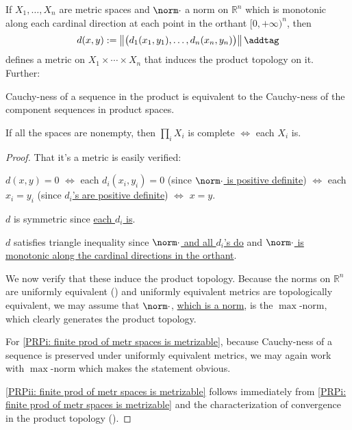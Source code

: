 	\begin{prp}\label{PRP: finite prod of metr spaces is metrizable}
		If $X_1, \ldots, X_n$ are metric spaces and $\norm\cdot$ a norm on $\mathbb R^n$ which is monotonic along each cardinal direction at each point in the orthant $[0, +\infty)^n$, then
		\[
		d(x, y) := \left\Vert \bigl(d_1(x_1, y_1), \ldots, d_n(x_n, y_n)\bigr) \right\Vert\addtag\label{EQN: metric on finite product}
		\]
		defines a metric on $X_1\times\cdots\times X_n$ that induces the product topology on it. Further:
		\begin{mylist}
			\item\label{PRPi: finite prod of metr spaces is metrizable} Cauchy-ness of a sequence in the product is equivalent to the Cauchy-ness of the component sequences in product spaces.
			
			\item\label{PRPii: finite prod of metr spaces is metrizable} If all the spaces are nonempty, then $\prod_i X_i$ is complete $\iff$ each $X_i$ is.
		\end{mylist}
	\end{prp}
	
	\begin{proof}
		That it's a metric is easily verified:
		\begin{prooflist}
			\item $d(x, y) = 0$ $\iff$ each $d_i(x_i, y_i) = 0$ (since \uline{$\norm\cdot$ is positive definite}) $\iff$ each $x_i = y_i$ (since \uline{$d_i$'s are positive definite}) $\iff$ $x = y$.
			
			\item $d$ is symmetric since \uline{each $d_i$ is}.
			
			\item $d$ satisfies triangle inequality since \uline{$\norm\cdot$ and all $d_i$'s do} and \uline{$\norm\cdot$ is monotonic along the cardinal directions in the orthant}.
		\end{prooflist}
		
		We now verify that these induce the product topology. Because the norms on $\mathbb R^n$ are uniformly equivalent () and uniformly equivalent metrics are topologically equivalent, we may assume \wlogg that $\norm\cdot$, \uline{which is a norm}, is the $\max$-norm, which clearly generates the product topology.
		
		For \ref{PRPi: finite prod of metr spaces is metrizable}, because Cauchy-ness of a sequence is preserved under uniformly equivalent metrics, we may again work with $\max$-norm which makes the statement obvious.
		
		\ref{PRPii: finite prod of metr spaces is metrizable} follows immediately from \ref{PRPi: finite prod of metr spaces is metrizable} and the characterization of convergence in the product topology ().
	\end{proof}
	

